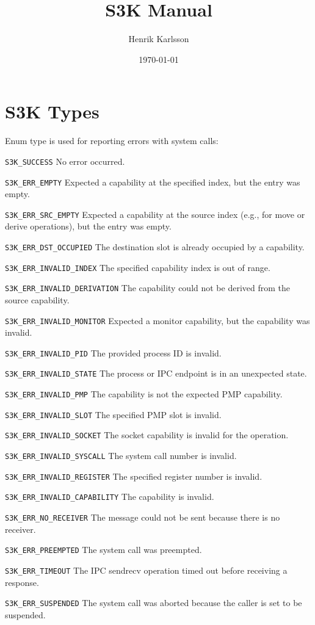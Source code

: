 \documentclass[a4paper,11pt]{article}
\title{S3K Manual}
\author{Henrik Karlsson}
\date{\today}
\newenvironment{enumdoc}[2]{
  \begin{tcolorbox}[breakable,title=\subsection{\texttt{enum #1}}]
  #2
  \begin{description}[leftmargin=!,style=nextline,noitemsep]
}{
  \end{description}
  \end{tcolorbox}
}
\begin{document}
\maketitle
\tableofcontents

\section{S3K Types}

\begin{enumdoc}{s3k\_err\_t}{Enum type is used for reporting errors with system calls:}
  \item[\texttt{S3K\_SUCCESS}] No error occurred.
  \item[\texttt{S3K\_ERR\_EMPTY}] Expected a capability at the specified index, but the entry was empty.
  \item[\texttt{S3K\_ERR\_SRC\_EMPTY}] Expected a capability at the source index (e.g., for move or derive operations), but the entry was empty.
  \item[\texttt{S3K\_ERR\_DST\_OCCUPIED}] The destination slot is already occupied by a capability.
  \item[\texttt{S3K\_ERR\_INVALID\_INDEX}] The specified capability index is out of range.
  \item[\texttt{S3K\_ERR\_INVALID\_DERIVATION}] The capability could not be derived from the source capability.
  \item[\texttt{S3K\_ERR\_INVALID\_MONITOR}] Expected a monitor capability, but the capability was invalid.
  \item[\texttt{S3K\_ERR\_INVALID\_PID}] The provided process ID is invalid.
  \item[\texttt{S3K\_ERR\_INVALID\_STATE}] The process or IPC endpoint is in an unexpected state.
  \item[\texttt{S3K\_ERR\_INVALID\_PMP}] The capability is not the expected PMP capability.
  \item[\texttt{S3K\_ERR\_INVALID\_SLOT}] The specified PMP slot is invalid.
  \item[\texttt{S3K\_ERR\_INVALID\_SOCKET}] The socket capability is invalid for the operation.
  \item[\texttt{S3K\_ERR\_INVALID\_SYSCALL}] The system call number is invalid.
  \item[\texttt{S3K\_ERR\_INVALID\_REGISTER}] The specified register number is invalid.
  \item[\texttt{S3K\_ERR\_INVALID\_CAPABILITY}] The capability is invalid.
  \item[\texttt{S3K\_ERR\_NO\_RECEIVER}] The message could not be sent because there is no receiver.
  \item[\texttt{S3K\_ERR\_PREEMPTED}] The system call was preempted.
  \item[\texttt{S3K\_ERR\_TIMEOUT}] The IPC sendrecv operation timed out before receiving a response.
  \item[\texttt{S3K\_ERR\_SUSPENDED}] The system call was aborted because the caller is set to be suspended.
\end{enumdoc}
\end{document}
